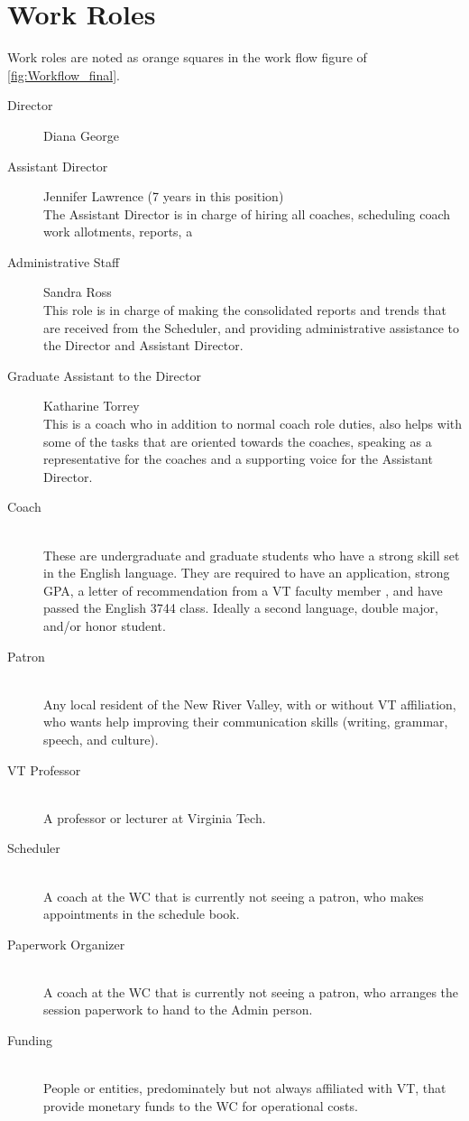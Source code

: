 \documentclass[12pt]{article} %
\begin{document}
\section{Work Roles} %
  Work roles are noted as orange squares in the work flow figure of \ref{fig:Workflow_final}.
  \begin{description} %
  \item[Director]
  Diana George
  \item[Assistant Director]
  Jennifer Lawrence (7 years in this position)\\
  The Assistant Director is in charge of hiring all coaches, scheduling coach work allotments, reports, a
  \item[Administrative Staff]
  Sandra Ross \\
  This role is in charge of making the consolidated reports and trends that are received from the Scheduler, and providing administrative assistance to the Director and Assistant Director. 
  \item[Graduate Assistant to the Director]
  Katharine Torrey \\
  This is a coach who in addition to normal coach role duties, also helps with some of the tasks that are oriented towards the coaches, speaking as a representative for the coaches and a supporting voice for the Assistant Director.
  \item[Coach] \hfill \\
  These are undergraduate and graduate students who have a strong skill set in the English language.
  They are required to have an application, strong GPA, a letter of recommendation from a VT faculty member , and have passed the English 3744 class.
  Ideally a second language, double major, and/or honor student.
  \item[Patron] \hfill \\
  Any local resident of the New River Valley, with or without VT affiliation, who wants help improving their communication skills (writing, grammar, speech, and culture).
  \item[VT Professor] \hfill \\
  A professor or lecturer at Virginia Tech.
  \item[Scheduler] \hfill \\
  A coach at the WC that is currently not seeing a patron, who makes appointments in the schedule book.
  \item[Paperwork Organizer] \hfill \\
  A coach at the WC that is currently not seeing a patron, who arranges the session paperwork to hand to the Admin person.
  \item[Funding] \hfill \\
  People or entities, predominately but not always affiliated with VT, that provide monetary funds to the WC for operational costs.
  \end{description} 
\end{document}
